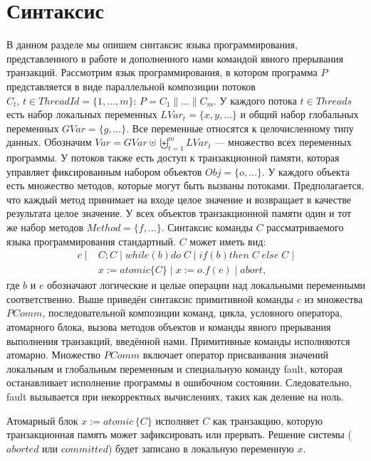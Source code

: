 \section{Синтаксис}
В данном разделе мы опишем синтаксис языка программирования, представленного в работе \cite{tms_article} и дополненного нами командой явного прерывания транзакций. Рассмотрим язык программирования, в котором программа $P$ представляется в виде параллельной композиции потоков  $C_t,\, t \in ThreadId=\{1, \ldots, m \}$: $P = C_1 \parallel \ldots \parallel C_m$. У каждого потока $t \in Threads$ есть набор локальных переменных $LVar_t = \{x,y, \ldots \}$ и общий набор глобальных переменных $GVar = \{g, \ldots \}$. Все переменные относятся к целочисленному типу данных. Обозначим  $Var = GVar \uplus \biguplus_{t = 1}^m LVar_{t}$ --- множество всех переменных программы. У потоков также есть доступ к транзакционной памяти, которая управляет фиксированным набором объектов $Obj = \{o, \ldots \}$. У каждого объекта есть множество методов, которые могут быть вызваны потоками. Предполагается, что каждый метод принимает на входе целое значение и возвращает в качестве результата целое значение. У всех объектов транзакционной памяти один и тот же набор методов $Method = \{f, \ldots \}$. Синтаксис команды $C$ рассматриваемого языка программирования стандартный. $C$ может иметь вид: 
\begin{align*}
c \; | \; &C;C \; | \; while \left (b \right) do \; C \; | \; if \left (b \right) then \; C \; else \; C \; | \\
&x := atomic\{C\} \; | \; x := o.f(e) \; | \; abort,
\end{align*}
где $b$ и $e$ обозначают логические и целые операции над локальными переменными соответственно. Выше приведён синтаксис примитивной команды $c$ из множества $PComm$, последовательной композиции команд, цикла, условного оператора, атомарного блока, вызова методов объектов и команды явного прерывания выполнения транзакций, введённой нами. Примитивные команды исполняются атомарно. Множество $PComm$ включает оператор присваивания значений локальным и глобальным переменным и специальную команду fault, которая останавливает исполнение программы в ошибочном состоянии. Следовательно, fault вызывается при некорректных вычислениях, таких как деление на ноль.

Атомарный блок $x := atomic \, \{C\}$ исполняет $C$ как транзакцию, которую транзакционная память может зафиксировать или прервать. Решение системы ($aborted$ или $committed$) будет записано в локальную переменную $x$. 

